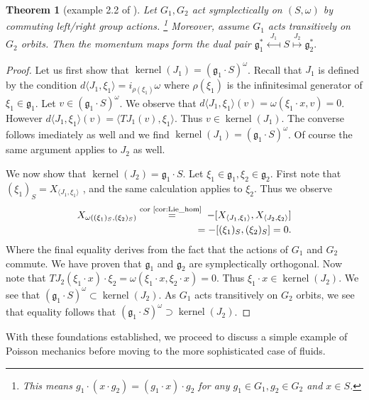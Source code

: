 \documentclass[12pt]{amsart}
\newtheorem{thm}{Theorem}[section]
\DeclareMathOperator{\kernel}{kernel}
\begin{document}
  \begin{thm}[example 2.2 of \cite{Gay-BalmazVizman2011}] \label{thm:commuting_actions}
    Let $G_1,G_2$ act symplectically on $(S,\omega)$
    by commuting left/right group actions.
    \footnote{This means 
      $g_1 \cdot (x \cdot g_2) = (g_1 \cdot x) \cdot g_2$
      for any $g_1 \in G_1, g_2 \in G_2$ and $x \in S$.}
    Moreover, assume $G_1$ acts transitively on $G_2$ orbits.
    Then the momentum maps form the dual pair
    $
      \mathfrak{g}^*_1
      \stackrel{J_1}{\longmapsfrom}
      S
      \stackrel{J_2}{\longmapsto}
      \mathfrak{g}_2^*.
    $
  \end{thm}
  \begin{proof}
    Let us first show that $\kernel(J_1) = (\mathfrak{g}_1 \cdot S )^\omega$.
    Recall that $J_1$ is defined by the condition
    $d \langle J_1 , \xi_1 \rangle = i_{\rho(\xi_1)} \omega$
    where $\rho(\xi_1)$ is the infinitesimal generator of
    $\xi_1 \in \mathfrak{g}_1$.
    Let $v \in (\mathfrak{g}_1 \cdot S)^\omega$.
    We observe that 
    $d \langle J_1 , \xi_1 \rangle (v) = \omega( \xi_1 \cdot x , v ) = 0$.
    However $d\langle J_1 , \xi_1 \rangle (v) = \langle TJ_1(v) , \xi_1 \rangle$.
    Thus $v \in \kernel(J_1)$.
    The converse follows imediately as well and we find
    $\kernel(J_1) = (\mathfrak{g}_1 \cdot S)^\omega$.
    Of course the same argument applies to $J_2$ as well.

    We now show that $\kernel(J_2) = \mathfrak{g}_1 \cdot S$.
    Let $\xi_1 \in \mathfrak{g}_1, \xi_2 \in \mathfrak{g}_2$.
    First note that $(\xi_1)_S = X_{ \langle J_1 , \xi_1 \rangle}$
    , and the same calculation applies to $\xi_2$.
    Thus we observe
    \begin{align*}
      X_{ \omega( (\xi_1)_S , (\xi_2)_S ) } 
      \stackrel{ \text{cor \ref{cor:Lie_hom} } }{=}
        - [X_{ \langle J_1,\xi_1\rangle} , X_{\langle J_2,\xi_2\rangle} ] \\
     = - [(\xi_1)_S , (\xi_2)_S] = 0.
    \end{align*}
    Where the final equality
    derives from the fact that the actions of $G_1$ and $G_2$ commute.
    We have proven that $\mathfrak{g}_1$ and $\mathfrak{g}_2$ are
    symplectically orthogonal.
    Now note that
    $TJ_2 ( \xi_1 \cdot x) \cdot \xi_2 = \omega( \xi_1 \cdot x , \xi_2 \cdot x) = 0$.
    Thus $\xi_1 \cdot x \in \kernel( J_2)$.
    We see that $(\mathfrak{g}_1 \cdot S)^\omega \subset \kernel(J_2)$.
    As $G_1$ acts transitively on $G_2$ orbits, we see that equality follows
    that $(\mathfrak{g}_1 \cdot S)^\omega \supset \kernel( J_2)$.
  \end{proof}
  With these foundations established, we proceed
  to discuss a simple example of Poisson mechanics
  before moving to the more sophisticated case
  of fluids.
\end{document}
